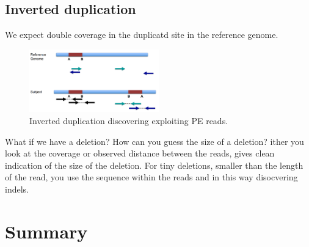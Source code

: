 \subsection{Inverted duplication}
We expect double coverage in the duplicatd site in the reference genome. 
\begin{figure}[htbp!]
    \centering
    \includegraphics[width=0.5\textwidth]{inverted.png}
    \caption{Inverted duplication discovering exploiting PE reads.}
    \label{fig:inversion}
\end{figure}

What if we have a deletion? How can you guess the size of a deletion? ither you look at the coverage or observed distance between the reads, gives clean indication of the size of the deletion. For tiny deletions, smaller than the length of the read, you use the sequence within the reads and in this way disocvering indels.  

\section{Summary}
















